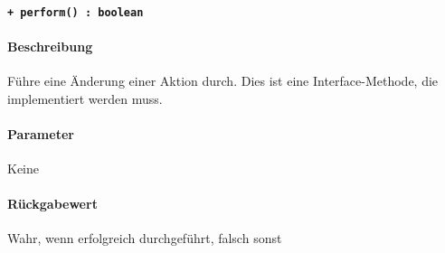 \paragraph{\texttt{+ perform() : boolean}}%
\paragraph*{Beschreibung}
Führe eine Änderung einer Aktion durch.
Dies ist eine Interface-Methode, die implementiert werden muss.
\paragraph*{Parameter}
Keine
\paragraph*{Rückgabewert}
Wahr, wenn erfolgreich durchgeführt, falsch sonst
